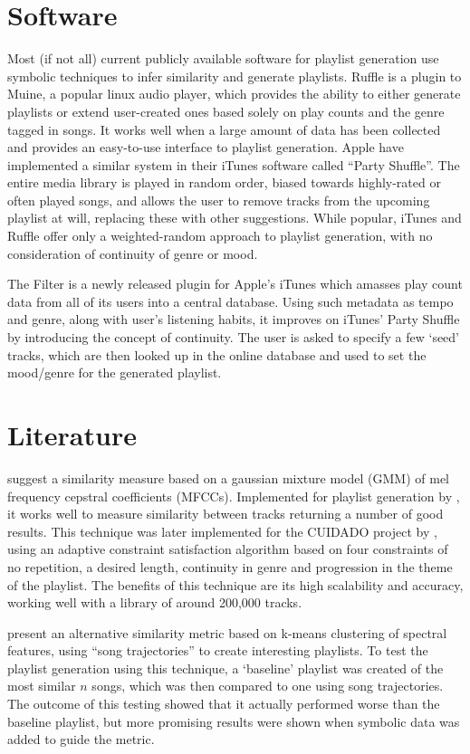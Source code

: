 \section{Software}
Most (if not all) current publicly available software for playlist generation use symbolic techniques to infer similarity and generate playlists. Ruffle is a plugin to Muine, a popular linux audio player, which provides the ability to either generate playlists or extend user-created ones based solely on play counts and the genre tagged in songs. It works well when a large amount of data has been collected and provides an easy-to-use interface to playlist generation. Apple have implemented a similar system in their iTunes software called ``Party Shuffle''. The entire media library is played in random order, biased towards highly-rated or often played songs, and allows the user to remove tracks from the upcoming playlist at will, replacing these with other suggestions. While popular, iTunes and Ruffle offer only a weighted-random approach to playlist generation, with no consideration of continuity of genre or mood.

The Filter is a newly released plugin for Apple's iTunes which amasses play count data from all of its users into a central database. Using such metadata as tempo and genre, along with user's listening habits, it improves on iTunes' Party Shuffle by introducing the concept of continuity. The user is asked to specify a few `seed' tracks, which are then looked up in the online database and used to set the mood/genre for the generated playlist.
\section{Literature}
\citet*{Aucouturier2002a} suggest a similarity measure based on a gaussian mixture model (GMM) of mel frequency cepstral coefficients (MFCCs). Implemented for playlist generation by \citet{Schnitzer2003}, it works well to measure similarity between tracks returning a number of good results. This technique was later implemented for the CUIDADO project by \citet*{Aucouturier2003}, using an adaptive constraint satisfaction algorithm based on four constraints of no repetition, a desired length, continuity in genre and progression in the theme of the playlist. The benefits of this technique are its high scalability and accuracy, working well with a library of around 200,000 tracks.

\citet{Logan2001} present an alternative similarity metric based on k-means clustering of spectral features, using ``song trajectories'' to create interesting playlists. To test the playlist generation using this technique, a `baseline' playlist was created of the most similar $n$ songs, which was then compared to one using song trajectories. The outcome of this testing showed that it actually performed worse than the baseline playlist, but more promising results were shown when symbolic data was added to guide the metric.

